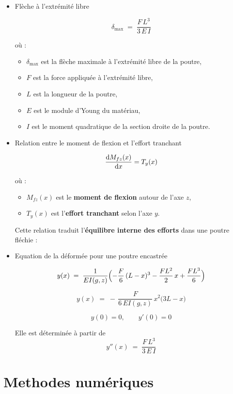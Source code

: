 \documentclass[12pt, a4paper]{article}
\begin{document}
\begin{itemize}
    \item Flèche à l'extrémité libre

    \[
\delta_{\text{max}} \;=\; \frac{F\,L^{3}}{3\,E\,I}
\]

où :
\begin{itemize}
  \item $\delta_{\text{max}}$ est la flèche maximale à l'extrémité libre de la poutre,
  \item $F$ est la force appliquée à l’extrémité libre,
  \item $L$ est la longueur de la poutre,
  \item $E$ est le module d’Young du matériau,
  \item $I$ est le moment quadratique de la section droite de la poutre.
\end{itemize}

    \item Relation entre le moment de flexion et l'effort tranchant

    \[
\dv{M_{fz}(x)}{x} = T_y(x)
\]

où :
\begin{itemize}
  \item $M_{fz}(x)$ est le \textbf{moment de flexion} autour de l’axe $z$,
  \item $T_y(x)$ est l’\textbf{effort tranchant} selon l’axe $y$.
\end{itemize}

\noindent
Cette relation traduit l’\textbf{équilibre interne des efforts} dans une poutre fléchie :

    \item Equation de la déformée pour une poutre encastrée

\[
y(x) \;=\; \frac{1}{E I(g,z)}
\Bigl(
-\frac{F}{6}\,(L-x)^{3}
-\frac{F L^{2}}{2}\,x
+\frac{F L^{3}}{6}
\Bigr)
\]

\[
y(x) \;=\; -\,\frac{F}{6\,E I(g,z)}\,x^{2}\bigl(3L - x\bigr)
\]

\[
y(0)=0, \qquad y'(0)=0
\]

Elle est déterminée à partir de 
  \[
y''(x) \;=\; \frac{F\,L^{3}}{3\,E\,I}
\]
\end{itemize}

\section{\textbf{Methodes numériques}}
\end{document}
